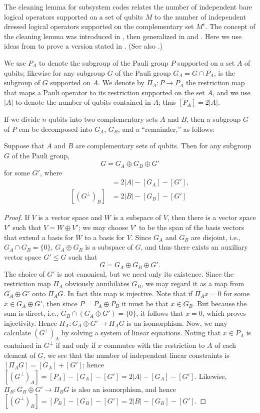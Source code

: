 The cleaning lemma for subsystem codes 
relates the number of independent bare logical operators supported on a set of qubits $M$ 
to the number of independent dressed logical operators supported on the complementary set $M^c$. 
The concept of the cleaning lemma was introduced in \cite{BravyiTerhal2009no-go}, 
then generalized in \cite{YoshidaChuang2010Framework} and  \cite{Bravyi2010Subsystem}. 
Here we use ideas from \cite{YoshidaChuang2010Framework} 
to prove a version stated in \cite{Bravyi2010Subsystem}.
(See also \cite{WildeFattal2009Nonlocal}.)

We use $P_A$ to denote the subgroup of the Pauli group $P$ supported on a set $A$ of qubits; likewise for any subgroup $G$ of the Pauli group $G_A= G \cap P_A$, is the subgroup of $G$ supported on $A$.
We denote by $\Pi_A : P \to P_A$ the restriction map that maps a Pauli operator to its restriction supported on the set $A$, 
and we use $|A|$ to denote the number of qubits contained in $A$; thus $[P_A] = 2|A|$.

If we divide $n$ qubits into two complementary sets $A$ and $B$, then a subgroup $G$ of $P$ can be decomposed into $G_A$, $G_B$, and a ``remainder,'' as follows:

\begin{lem}
Suppose that $A$ and $B$ are complementary sets of qubits. Then for any subgroup $G$ of the Pauli group,
\[
 G = G_A \oplus G_B \oplus G'
\]
for some $G'$, where
\begin{align*}
 [ (G^\perp)_A ] &= 2|A| - [G_A] - [G'] ,\\
 [ (G^\perp)_B ] &= 2|B| - [G_B] - [G']
\end{align*}
\end{lem}
\begin{proof}
If $V$ is a vector space and $W$ is a subspace of $V$, then there is a vector space $V'$ such that $V=W\oplus V'$; we may choose $V'$ to be the span of the basis vectors that extend a basis for $W$ to a basis for $V$. 
Since $G_A$ and $G_B$ are disjoint, i.e., $G_A \cap G_B = \{0\}$, $G_A\oplus G_B$ is a subspace of $G$, and thus there exists an auxiliary vector space $G' \leq G$ such that
\[
 G = G_A \oplus G_B \oplus G'.
\]
The choice of $G'$ is not canonical, but we need only its existence. Since the restriction map $\Pi_A$ obviously annihilates $G_B$, we may regard it as a map from $G_A\oplus G'$ onto $\Pi_A G$. In fact this map is injective. Note that if $\Pi_A x = 0$ for some $x \in G_A\oplus G'$, then since $P=P_A\oplus P_B$ it must be that $x \in G_B$. But because the sum is direct, i.e., $G_B \cap (G_A\oplus G') = \{0\}$, it follows that $x = 0$, which proves injectivity. Hence $\Pi_A: G_A\oplus G'\to \Pi_A G$ is an isomorphism. Now, we may calculate $(G^\perp)_A$ by solving a system of linear equations. Noting that $x \in P_A$ is contained in $G^\perp$ if and only if $x$ commutes with the restriction to $A$ of each element of $G$, we see that the number of independent linear constraints is $[\Pi_A G] = [G_A] + [G']$; hence $[(G^\perp)_A]=[P_A] - [G_A] - [G']= 2|A| - [G_A] - [G']$. Likewise, $\Pi_B: G_B\oplus G'\to \Pi_B G$ is also an isomorphism, and hence $[(G^\perp)_B]=[P_B] - [G_B] - [G']= 2|B| - [G_B] - [G']$.
\end{proof}

